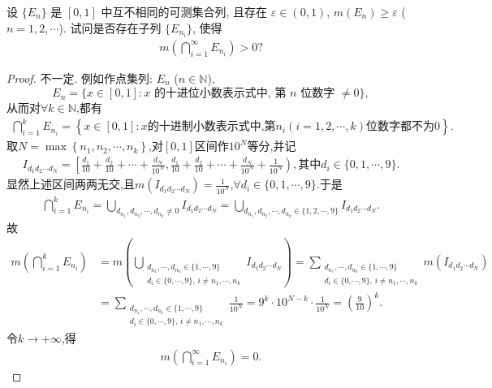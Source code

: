 \documentclass[../../main.tex]{subfiles}%
\begin{document}
\begin{example}
设 $\{E_n\}$ 是 $[0,1]$ 中互不相同的可测集合列, 且存在 $\varepsilon\in (0,1)$, $m(E_n)\geqslant\varepsilon$ ($n=1,2,\cdots$). 试问是否存在子列 $\{E_{n_i}\}$, 使得
\begin{align*}
m\left(\bigcap\limits_{i=1}^{\infty}E_{n_i}\right)>0?
\end{align*}
\end{example}
\begin{proof}

不一定. 例如作点集列: $E_n$ ($n\in\mathbb{N}$),
\[
E_n=\{x\in[0,1]: x\text{ 的十进位小数表示式中, 第 }n\text{ 位数字 }\neq 0\},
\]
从而对$\forall k\in \mathbb{N}$,都有
\begin{align*}
\bigcap\limits_{i=1}^k{E_{n_i}}=\left\{ x\in [0,1]:x\text{的十进制小数表示式中,第}n_i\left( i=1,2,\cdots ,k \right) \text{位数字都不为}0 \right\}.
\end{align*}
取$N=\max\left\{ n_1,n_2,\cdots ,n_k \right\}$,对$[0,1]$区间作$10^N$等分,并记
\begin{align*}
I_{d_1d_2\cdots d_N}=\left[ \frac{d_1}{10}+\frac{d_2}{10}+\cdots +\frac{d_N}{10^N},\frac{d_1}{10}+\frac{d_2}{10}+\cdots +\frac{d_N}{10^N}+\frac{1}{10^N} \right),\text{其中}d_i\in \{0,1,\cdots ,9\}.
\end{align*}
显然上述区间两两无交,且$m\left( I_{d_1d_2\cdots d_N} \right) =\frac{1}{10^N}$,$\forall d_i\in \{0,1,\cdots ,9\}$.于是
\begin{align*}
\bigcap\limits_{i=1}^k{E_{n_i}}=\bigcup\limits_{d_{n_1},d_{n_2},\cdots ,d_{n_k}\ne 0}{I_{d_1d_2\cdots d_N}}=\bigcup\limits_{d_{n_1},d_{n_2},\cdots ,d_{n_k}\in \{1,2,\cdots ,9\}}{I_{d_1d_2\cdots d_N}}.
\end{align*}
故
\begin{align*}
m\left( \bigcap_{i=1}^k{E_{n_i}} \right) 
&= m\left( \bigcup_{\substack{d_{n_1},\cdots,d_{n_k}\in\{1,\cdots,9\} \\ d_i\in\{0,\cdots,9\},\,i\neq n_1,\cdots,n_k}} I_{d_1d_2\cdots d_N} \right) 
= \sum_{\substack{d_{n_1},\cdots,d_{n_k}\in\{1,\cdots,9\} \\ d_i\in\{0,\cdots,9\},\,i\neq n_1,\cdots,n_k}} m\left( I_{d_1d_2\cdots d_N} \right) \\
&= \sum_{\substack{d_{n_1},\cdots,d_{n_k}\in\{1,\cdots,9\} \\ d_i\in\{0,\cdots,9\},\,i\neq n_1,\cdots,n_k}} \frac{1}{10^N} 
= 9^k \cdot 10^{N-k} \cdot \frac{1}{10^N} = \left( \frac{9}{10} \right)^k.
\end{align*}
令$k\to +\infty$,得
\begin{align*}
m\left( \bigcap_{i=1}^{\infty}{E_{n_i}} \right)=0. 
\end{align*}

\end{proof}
\end{document}
